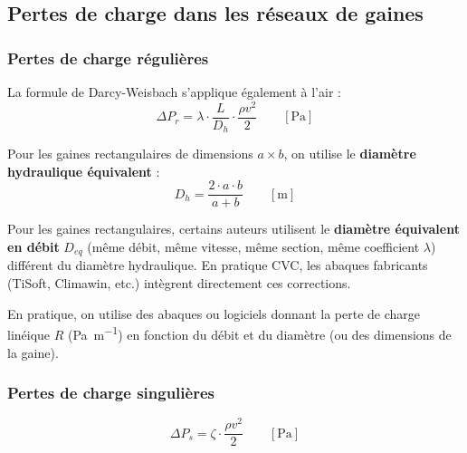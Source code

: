 \subsection{Pertes de charge dans les réseaux de gaines}

\subsubsection{Pertes de charge régulières}

La formule de Darcy-Weisbach s'applique également à l'air :
\begin{equation}
  \Delta P_r = \lambda \cdot \frac{L}{D_h} \cdot \frac{\rho v^2}{2} \qquad \left[\si{\pascal}\right]
\end{equation}

Pour les gaines rectangulaires de dimensions $a \times b$, on utilise le \textbf{diamètre hydraulique équivalent} :
\begin{equation}
  D_h = \frac{2 \cdot a \cdot b}{a + b} \qquad \left[\si{\metre}\right]
\end{equation}

\begin{attention}
Pour les gaines rectangulaires, certains auteurs utilisent le \textbf{diamètre équivalent en débit} $D_{eq}$ (même débit, même vitesse, même section, même coefficient $\lambda$) différent du diamètre hydraulique. En pratique CVC, les abaques fabricants (TiSoft, Climawin, etc.) intègrent directement ces corrections.
\end{attention}

En pratique, on utilise des abaques ou logiciels donnant la perte de charge linéique $R$ (\si{\pascal\per\metre}) en fonction du débit et du diamètre (ou des dimensions de la gaine).

\subsubsection{Pertes de charge singulières}

\begin{equation}
  \Delta P_s = \zeta \cdot \frac{\rho v^2}{2} \qquad \left[\si{\pascal}\right]
\end{equation}

